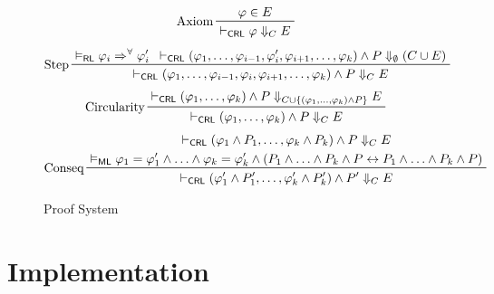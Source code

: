 \documentclass{article}
\newcommand{\RL}{\mathsf{RL}}
\newcommand{\ML}{\mathsf{ML}}
\newcommand{\CRL}{\mathsf{CRL}}
\begin{document}
\begin{figure}
    \centering
    \begin{align*}
    & \prftree[l]{Axiom}{\varphi \in E}{\vdash_\CRL \varphi \Downarrow_{C} E}   \\
    \end{align*}
    \begin{align*}
    & \prftree[l]{Step}
    {\vDash_\RL \varphi_i \Rightarrow^\forall \varphi_i^\prime}
    { \vdash_\CRL (\varphi_1, \ldots, \varphi_{i-1}, \varphi_i^\prime, \varphi_{i+1}, \ldots, \varphi_k)
      \land P
      \Downarrow_{\emptyset} (C \cup E)
    }
    {\vdash_\CRL (\varphi_1, \ldots, \varphi_{i-1}, \varphi_i, \varphi_{i+1}, \ldots, \varphi_k) \land P \Downarrow_{C} E}
    \end{align*}
    \begin{align*}
    & \prftree[l]{Circularity}
      { \vdash_\CRL (\varphi_1, \ldots, \varphi_k) \land P \Downarrow_{C \cup \{ (\varphi_1, \ldots, \varphi_k) \land P \} } E}
      { \vdash_\CRL (\varphi_1, \ldots, \varphi_k) \land P \Downarrow_{C} E}
      \\
    \end{align*}
    \begin{align*}
    & \prftree[l]{Conseq}
      { \prfStackPremises
        { \vdash_\CRL (\varphi_1 \land P_1, \ldots, \varphi_k \land P_k) \land P \Downarrow_{C} E}
        { \vDash_\ML \varphi_1 = \varphi_1^\prime \land \ldots \land \varphi_k = \varphi_k^\prime
        \land (P_1 \land \ldots \land P_k \land P \leftrightarrow P_1 \land \ldots \land P_k \land P) }
      }
      { \vdash_\CRL (\varphi_1^\prime \land P_1^\prime, \ldots, \varphi_k^\prime \land P_k^\prime) \land P^\prime \Downarrow_{C} E}
    \end{align*}
    \caption{Proof System}
    \label{fig:my_label}
\end{figure}

\section{Implementation}




\appendix
\end{document}
